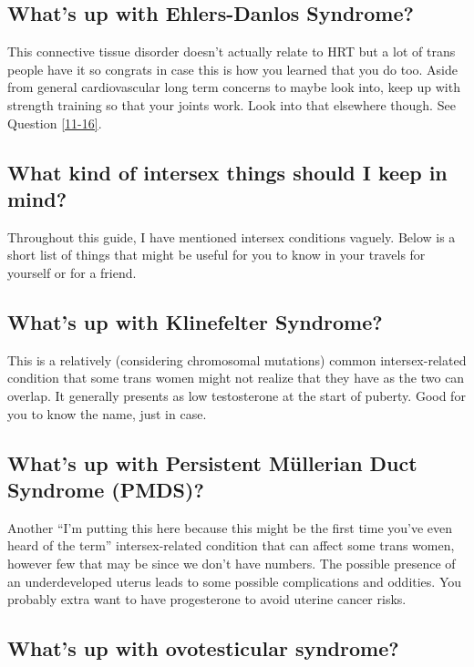 \documentclass{article}
\begin{document}
\subsection{What’s up with Ehlers-Danlos Syndrome?}

This connective tissue disorder doesn’t actually relate to HRT but a lot of trans people have it so congrats in case this is how you learned that you do too. Aside from general cardiovascular long term concerns to maybe look into, keep up with strength training so that your joints work. Look into that elsewhere though. See Question \ref{11-16}.

\subsection{What kind of intersex things should I keep in mind?}

Throughout this guide, I have mentioned intersex conditions vaguely. Below is a short list of things that might be useful for you to know in your travels for yourself or for a friend. 

\subsection{What’s up with Klinefelter Syndrome?}

This is a relatively (considering chromosomal mutations) common intersex-related condition that some trans women might not realize that they have as the two can overlap. It generally presents as low testosterone at the start of puberty. Good for you to know the name, just in case.

\subsection{What’s up with Persistent Müllerian Duct Syndrome (PMDS)?}

Another “I’m putting this here because this might be the first time you’ve even heard of the term” intersex-related condition that can affect some trans women, however few that may be since we don’t have numbers. The possible presence of an underdeveloped uterus leads to some possible complications and oddities. You probably extra want to have progesterone to avoid uterine cancer risks.

\subsection{What's up with ovotesticular syndrome?}
\end{document}
